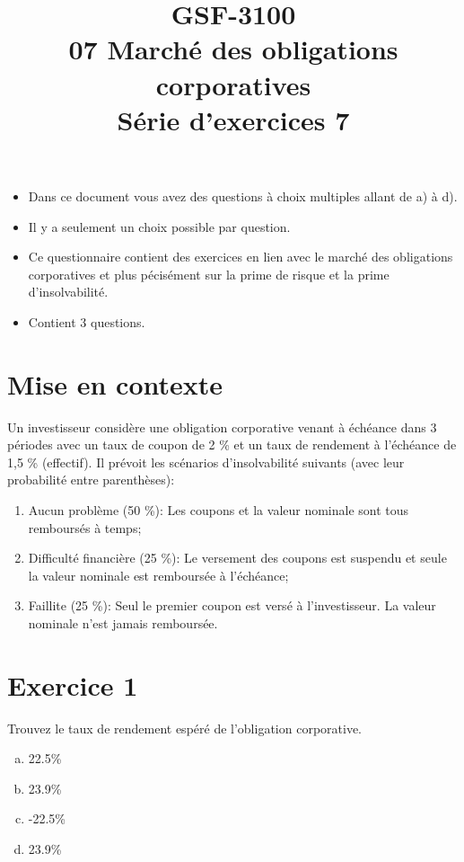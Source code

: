 \documentclass[10pt,a4paper]{article}
\title{GSF-3100 \\
07 Marché des obligations corporatives \\
Série d'exercices 7}
\begin{document}
\maketitle

\begin{itemize}
\item Dans ce document vous avez des questions à choix multiples allant de a) à d).  
\item Il y a seulement un choix possible par question.
\item Ce questionnaire contient des exercices en lien avec le marché des obligations corporatives et plus pécisément sur la prime de risque et la prime d'insolvabilité.
\item Contient 3 questions. 
\end{itemize}
 
\newpage

\section*{Mise en contexte}

Un investisseur considère une obligation corporative venant à échéance dans 3 périodes avec un taux de coupon de 2 \% et un taux de rendement à l’échéance de 1,5 \% (effectif). Il prévoit les scénarios d’insolvabilité suivants (avec leur probabilité entre parenthèses): 

\begin{enumerate}
\item Aucun problème (50 \%): Les coupons et la valeur nominale sont tous remboursés à temps;

\item Difficulté financière (25 \%): Le versement des coupons est suspendu et seule la valeur nominale est remboursée à l'échéance;

\item Faillite (25 \%): Seul le premier coupon est versé à l'investisseur. La valeur nominale n'est jamais remboursée.
\end{enumerate}

\section*{Exercice 1}
Trouvez le taux de rendement espéré de l'obligation corporative.

\begin{enumerate}[a)]
\item 22.5\%
\item 23.9\%
\item -22.5\%
\item 23.9\%
\end{enumerate}
\end{document}
